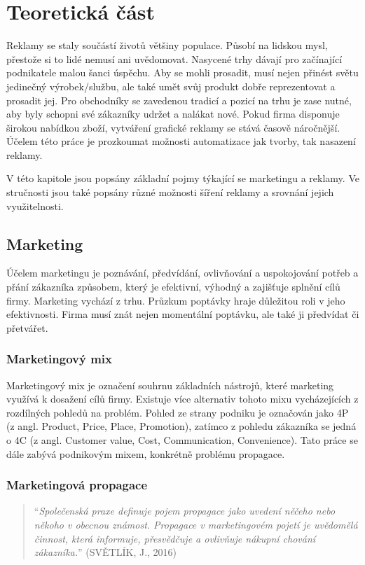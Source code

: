 \chapter{Teoretická část}
\label{chap:theoretical}
Reklamy se staly součástí životů většiny populace. Působí na lidskou mysl, přestože si to lidé nemusí ani uvědomovat.
Nasycené trhy dávají pro začínající podnikatele malou šanci úspěchu. Aby se mohli prosadit, musí nejen přinést světu jedinečný výrobek/službu,
ale také umět svůj produkt dobře reprezentovat a prosadit jej. Pro obchodníky se zavedenou tradicí a pozicí na trhu je zase nutné,
aby byly schopni své zákazníky udržet a nalákat nové. Pokud firma disponuje širokou nabídkou zboží,
vytváření grafické reklamy se stává časově náročnější.
Účelem této práce je prozkoumat možnosti automatizace jak tvorby, tak nasazení reklamy. 

V této kapitole jsou popsány základní pojmy týkající se marketingu a reklamy. Ve stručnosti jsou také popsány různé možnosti šíření reklamy
a srovnání jejich využitelnosti.

\section{Marketing}
\label{sec:marketing}
Účelem marketingu je poznávání, předvídání, ovlivňování a uspokojování potřeb a přání zákazníka způsobem, který je efektivní, výhodný a zajišťuje splnění
cílů firmy. Marketing vychází z trhu. Průzkum poptávky hraje důležitou roli v jeho efektivnosti.
Firma musí znát nejen momentální poptávku, ale také ji předvídat či přetvářet.

    \subsection{Marketingový mix}\label{ssec:marketing-mix}
    Marketingový mix je označení souhrnu základních nástrojů, které marketing využívá k dosažení cílů firmy.
    Existuje více alternativ tohoto mixu vycházejících z rozdílných pohledů na problém.
    Pohled ze strany podniku je označován jako 4P (z angl. Product, Price, Place, Promotion),
    zatímco z pohledu zákazníka se jedná o 4C (z angl. Customer value, Cost, Communication, Convenience).
    Tato práce se dále zabývá podnikovým mixem, konkrétně problému propagace.

    \subsection{Marketingová propagace}\label{ssec:marketing-propagation}
    \begin{quote}
        \enquote{\emph{Společenská praxe definuje pojem propagace jako uvedení něčeho nebo někoho v obecnou známost.
        Propagace v marketingovém pojetí je uvědomělá činnost, která informuje, přesvědčuje a ovlivňuje nákupní chování zákazníka.}}
        (SVĚTLÍK, J., 2016) \cite{svetlik:marketing}
    \end{quote}

